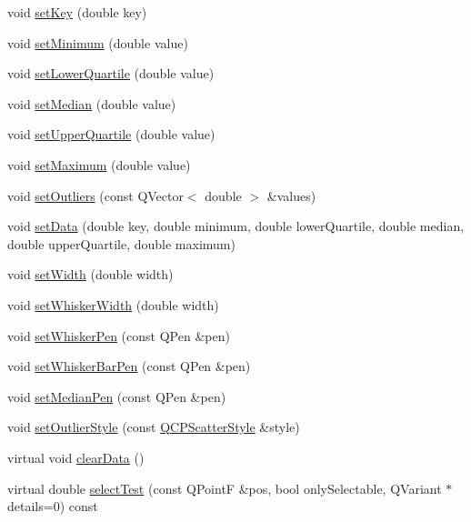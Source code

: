 \begin{DoxyCompactItemize}
\item 
void \hyperlink{classQCPStatisticalBox_a84a1c6d34b2f9af40bca0c527d51e97e}{set\-Key} (double key)
\item 
void \hyperlink{classQCPStatisticalBox_a84ff7cc61ba44890f0c3e0c99c19941e}{set\-Minimum} (double value)
\item 
void \hyperlink{classQCPStatisticalBox_a680941af5e23d902013962fa67223f9e}{set\-Lower\-Quartile} (double value)
\item 
void \hyperlink{classQCPStatisticalBox_a65970e77a897da4ecb4b15300868aad3}{set\-Median} (double value)
\item 
void \hyperlink{classQCPStatisticalBox_a65a1375f941c5a2077b5201229e89346}{set\-Upper\-Quartile} (double value)
\item 
void \hyperlink{classQCPStatisticalBox_acec5ad1901f00f2c5387cfb4d9787eb3}{set\-Maximum} (double value)
\item 
void \hyperlink{classQCPStatisticalBox_af9bc09620e0bf93bf444ee35e5800d1d}{set\-Outliers} (const \-Q\-Vector$<$ double $>$ \&values)
\item 
void \hyperlink{classQCPStatisticalBox_adf50c57b635edb12470c0e4a986aff37}{set\-Data} (double key, double minimum, double lower\-Quartile, double median, double upper\-Quartile, double maximum)
\item 
void \hyperlink{classQCPStatisticalBox_a0b62775bd67301b1eba5c785f2b26f14}{set\-Width} (double width)
\item 
void \hyperlink{classQCPStatisticalBox_adf378812446bd66f34d1f7f293d991cd}{set\-Whisker\-Width} (double width)
\item 
void \hyperlink{classQCPStatisticalBox_a4a5034cb3b9b040444df05ab1684620b}{set\-Whisker\-Pen} (const \-Q\-Pen \&pen)
\item 
void \hyperlink{classQCPStatisticalBox_aa8d3e503897788e1abf68dc74b5f147f}{set\-Whisker\-Bar\-Pen} (const \-Q\-Pen \&pen)
\item 
void \hyperlink{classQCPStatisticalBox_a7260ac55b669f5d0a74f16d5ca84c52c}{set\-Median\-Pen} (const \-Q\-Pen \&pen)
\item 
void \hyperlink{classQCPStatisticalBox_ad5241943422eb8e58360a97e99ad6aa7}{set\-Outlier\-Style} (const \hyperlink{classQCPScatterStyle}{\-Q\-C\-P\-Scatter\-Style} \&style)
\item 
virtual void \hyperlink{classQCPStatisticalBox_a19112994449df0c20287858436cc68e3}{clear\-Data} ()
\item 
virtual double \hyperlink{classQCPStatisticalBox_a7d3ac843dc48a085740fdfc4319a89cc}{select\-Test} (const \-Q\-Point\-F \&pos, bool only\-Selectable, \-Q\-Variant $\ast$details=0) const 
\end{DoxyCompactItemize}
